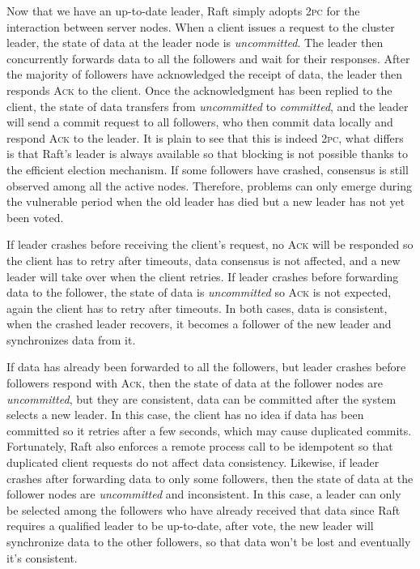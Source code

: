 \documentclass[11pt]{article}
\begin{document}
    Now that we have an up-to-date leader, Raft simply adopts \textsc{2pc} for the interaction between server nodes. When a client issues a request to the cluster leader, the state of data at the leader node is \textit{uncommitted}. The leader then concurrently forwards data to all the followers and wait for their responses. After the majority of followers have acknowledged the receipt of data, the leader then responds \textsc{Ack} to the client. Once the acknowledgment has been replied to the client, the state of data transfers from \textit{uncommitted} to \textit{committed}, and the leader will send a commit request to all followers, who then commit data locally and respond \textsc{Ack} to the leader. It is plain to see that this is indeed \textsc{2pc}, what differs is that Raft's leader is always available so that blocking is not possible thanks to the efficient election mechanism. If some followers have crashed, consensus is still observed among all the active nodes. Therefore, problems can only emerge during the vulnerable period when the old leader has died but a new leader has not yet been voted.

    If leader crashes before receiving the client's request, no \textsc{Ack} will be responded so the client has to retry after timeouts, data consensus is not affected, and a new leader will take over when the client retries. If leader crashes before forwarding data to the follower, the state of data is \textit{uncommitted} so \textsc{Ack} is not expected, again the client has to retry after timeouts. In both cases, data is consistent, when the crashed leader recovers, it becomes a follower of the new leader and synchronizes data from it.

    If data has already been forwarded to all the followers, but leader crashes before followers respond with \textsc{Ack}, then the state of data at the follower nodes are \textit{uncommitted}, but they are consistent, data can be committed after the system selects a new leader. In this case, the client has no idea if data has been committed so it retries after a few seconds, which may cause duplicated commits. Fortunately, Raft also enforces a remote process call to be idempotent so that duplicated client requests do not affect data consistency. Likewise, if leader crashes after forwarding data to only some followers, then the state of data at the follower nodes are \textit{uncommitted} and inconsistent. In this case, a leader can only be selected among the followers who have already received that data since Raft requires a qualified leader to be up-to-date, after vote, the new leader will synchronize data to the other followers, so that data won't be lost and eventually it's consistent.
\end{document}
